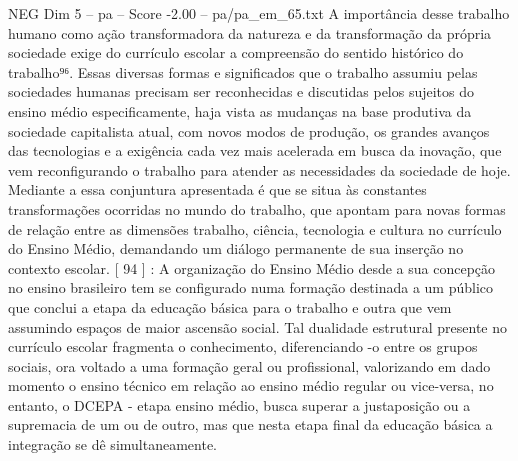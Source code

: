 \begin{textsample}{NEG Dim 5 – pa – Score -2.00 – pa/pa\_em\_65.txt}
A importância desse trabalho humano como ação transformadora da natureza e da transformação da própria sociedade exige do currículo escolar a compreensão do sentido histórico do trabalho⁹⁶.
Essas diversas formas e significados que o trabalho assumiu pelas sociedades humanas precisam ser reconhecidas e discutidas pelos sujeitos do ensino médio especificamente, haja vista as mudanças na base produtiva da sociedade capitalista atual, com novos modos de produção, os grandes avanços das tecnologias e a exigência cada vez mais acelerada em busca da inovação, que vem reconfigurando o trabalho para atender as necessidades da sociedade de hoje.
Mediante a essa conjuntura apresentada é que se situa às constantes transformações ocorridas no mundo do trabalho, que apontam para novas formas de relação entre as dimensões trabalho, ciência, tecnologia e cultura no currículo do Ensino Médio, demandando um diálogo permanente de sua inserção no contexto escolar. [ 94 ] : A organização do Ensino Médio desde a sua concepção no ensino brasileiro tem se configurado numa formação destinada a um público que conclui a etapa da educação básica para o trabalho e outra que vem assumindo espaços de maior ascensão social.
Tal dualidade estrutural presente no currículo escolar fragmenta o conhecimento, diferenciando -o entre os grupos sociais, ora voltado a uma formação geral ou profissional, valorizando em dado momento o ensino técnico em relação ao ensino médio regular ou vice-versa, no entanto, o DCEPA - etapa ensino médio, busca superar a justaposição ou a supremacia de um ou de outro, mas que nesta etapa final da educação básica a integração se dê simultaneamente.

\end{textsample}
